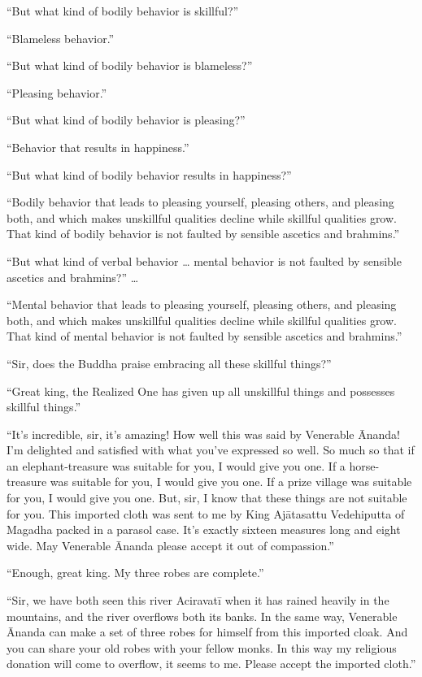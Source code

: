 \documentclass[12pt,openany]{book}%
\begin{document}
“But what kind of bodily behavior is skillful?” 

“Blameless behavior.” 

“But what kind of bodily behavior is blameless?” 

“Pleasing behavior.” 

“But what kind of bodily behavior is pleasing?” 

“Behavior that results in happiness.” 

“But what kind of bodily behavior results in happiness?” 

“Bodily behavior that leads to pleasing yourself, pleasing others, and pleasing both, and which makes unskillful qualities decline while skillful qualities grow. That kind of bodily behavior is not faulted by sensible ascetics and brahmins.” 

“But what kind of verbal behavior … mental behavior is not faulted by sensible ascetics and brahmins?” … 

“Mental behavior that leads to pleasing yourself, pleasing others, and pleasing both, and which makes unskillful qualities decline while skillful qualities grow. That kind of mental behavior is not faulted by sensible ascetics and brahmins.” 

“Sir, does the Buddha praise embracing all these skillful things?” 

“Great king, the Realized One has given up all unskillful things and possesses skillful things.” 

“It’s incredible, sir, it’s amazing! How well this was said by Venerable Ānanda! I’m delighted and satisfied with what you’ve expressed so well. So much so that if an elephant-treasure was suitable for you, I would give you one. If a horse-treasure was suitable for you, I would give you one. If a prize village was suitable for you, I would give you one. But, sir, I know that these things are not suitable for you. This imported cloth was sent to me by King \textsanskrit{Ajātasattu} Vedehiputta of Magadha packed in a parasol case. It’s exactly sixteen measures long and eight wide. May Venerable Ānanda please accept it out of compassion.” 

“Enough, great king. My three robes are complete.” 

“Sir, we have both seen this river \textsanskrit{Aciravatī} when it has rained heavily in the mountains, and the river overflows both its banks. In the same way, Venerable Ānanda can make a set of three robes for himself from this imported cloak. And you can share your old robes with your fellow monks. In this way my religious donation will come to overflow, it seems to me. Please accept the imported cloth.” 
\end{document}
